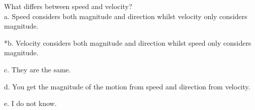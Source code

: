
What differs between speed and velocity? \\

a.  Speed considers both magnitude and direction whilst velocity only considers magnitude.

*b. Velocity considers both magnitude and direction whilst speed only considers magnitude.

c. They are the same.

d. You get the magnitude  of the motion from speed and direction from velocity.

e. I do not know. \\
